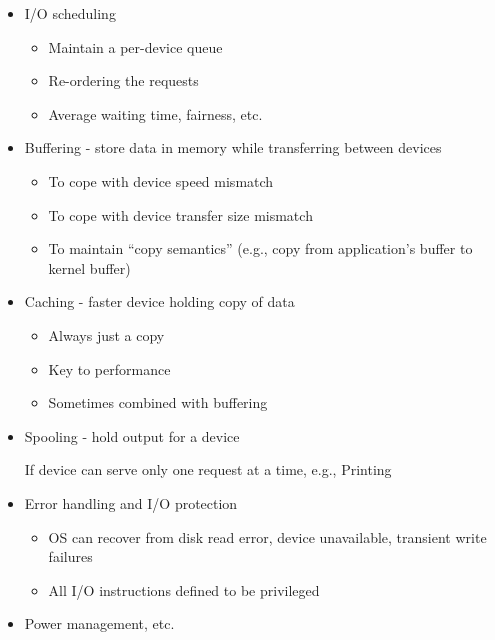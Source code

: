 \documentclass[11pt]{homework}
\begin{document}
\question
\begin{itemize}
    \item I/O scheduling
          \begin{itemize}
              \item Maintain a per-device queue
              \item Re-ordering the requests
              \item Average waiting time, fairness, etc.
          \end{itemize}
    \item Buffering - store data in memory while transferring between devices
          \begin{itemize}
              \item To cope with device speed mismatch
              \item To cope with device transfer size mismatch
              \item To maintain ``copy semantics'' (e.g., copy from application's buffer to kernel buffer)
          \end{itemize}
    \item Caching - faster device holding copy of data
          \begin{itemize}
              \item Always just a copy
              \item Key to performance
              \item Sometimes combined with buffering
          \end{itemize}
    \item Spooling - hold output for a device

          If device can serve only one request at a time, e.g., Printing

    \item Error handling and I/O protection
          \begin{itemize}
              \item OS can recover from disk read error, device unavailable, transient write failures
              \item All I/O instructions defined to be privileged
          \end{itemize}
    \item Power management, etc.
\end{itemize}
\end{document}
